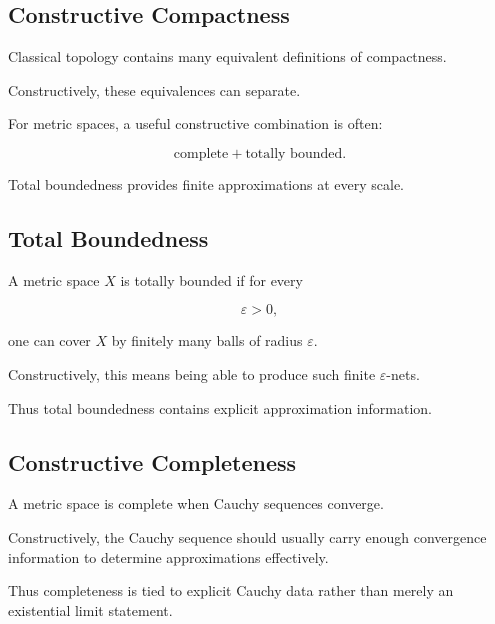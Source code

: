 \subsection{Constructive Compactness}
\label{subsec:constructive-compactness}

Classical topology contains many equivalent definitions of compactness.

Constructively, these equivalences can separate.

For metric spaces, a useful constructive combination is often:

\[
\boxed{
\text{complete}
+
\text{totally bounded}.
}
\]

Total boundedness provides finite approximations at every scale.

\subsection{Total Boundedness}
\label{subsec:constructive-total-boundedness}

A metric space \(X\) is totally bounded if for every

\[
\varepsilon>0,
\]

one can cover \(X\) by finitely many balls of radius \(\varepsilon\).

Constructively, this means being able to produce such finite
\(\varepsilon\)-nets.

Thus total boundedness contains explicit approximation information.

\subsection{Constructive Completeness}
\label{subsec:constructive-completeness}

A metric space is complete when Cauchy sequences converge.

Constructively, the Cauchy sequence should usually carry enough convergence
information to determine approximations effectively.

Thus completeness is tied to explicit Cauchy data rather than merely an
existential limit statement.

